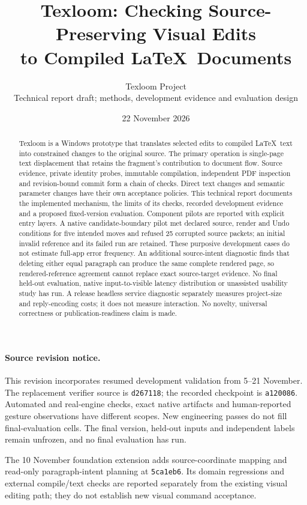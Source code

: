\documentclass[10pt,a4paper]{article}
\title{\vspace{-1.7em}Texloom: Checking Source-Preserving Visual Edits\\to Compiled \LaTeX\ Documents}
\author{Texloom Project\\\small Technical report draft; methods, development evidence and evaluation design}
\date{22 November 2026}
\newcommand{\code}[1]{\texttt{#1}}
\begin{document}
\maketitle
\thispagestyle{fancy}
\vspace{-1.5em}
\begin{abstract}
Texloom is a Windows prototype that translates selected edits to compiled
\LaTeX\ text into constrained changes to the original source. The primary
operation is single-page text displacement that retains the fragment's
contribution to document flow. Source evidence, private identity probes,
immutable compilation, independent PDF inspection and revision-bound commit
form a chain of checks. Direct text changes and semantic parameter changes have their own
acceptance policies. This technical report documents the implemented mechanism, the
limits of its checks, recorded development evidence and a proposed fixed-version
evaluation. Component pilots are reported with explicit entry layers.
A native candidate-boundary pilot met declared source, render and Undo
conditions for five intended moves and refused 25 corrupted source packets;
an initial invalid reference and its failed run are retained. These purposive
development cases do not estimate full-app error frequency.
An additional source-intent diagnostic finds that deleting either equal
paragraph can produce the same complete rendered page, so rendered-reference
agreement cannot replace exact source-target evidence. No final held-out
evaluation, native input-to-visible latency distribution or unassisted
usability study has run. A release headless service diagnostic separately
measures project-size and reply-encoding costs; it does not measure interaction.
No novelty, universal correctness or publication-readiness claim is made.
\end{abstract}

\paragraph{Source revision notice.}
This revision incorporates resumed development validation from 5--21 November.
The replacement verifier source is \code{d267118}; the recorded checkpoint is
\code{a120086}. Automated and real-engine checks, exact native artifacts and
human-reported gesture observations have different scopes. New engineering
passes do not fill final-evaluation cells. The final version, held-out inputs
and independent labels remain unfrozen, and no final evaluation has run.

The 10 November foundation extension adds source-coordinate mapping and
read-only paragraph-intent planning at \code{5ca1eb6}. Its domain regressions
and external compile/text checks are reported separately from the existing
visual editing path; they do not establish new visual command acceptance.
\end{document}
